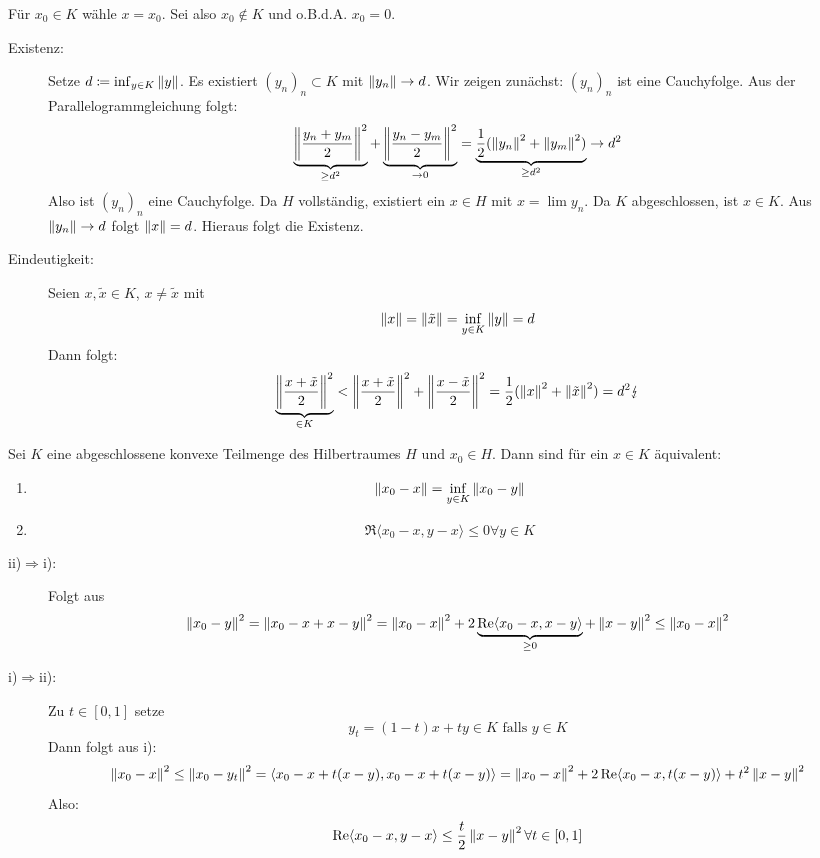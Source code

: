 \begin{beweis}
	F\"ur $ x_0\in K $ w\"ahle $ x=x_0 $. Sei also $ x_0\notin K $ und o.B.d.A. $ x_0=0 $.
	\begin{description}
		\item[Existenz:] Setze $ d\coloneqq\inf_{y\in K}\left\|y\right\| $. Es existiert $ (y_n)_n\subset K $ mit $ \left\|y_n\right\|\rightarrow d $. Wir zeigen zun\"achst: $ (y_n)_n $ ist eine Cauchyfolge. Aus der Parallelogrammgleichung folgt:
		\[ \underbrace{\left\|\frac{y_n+y_m}{2}\right\|^2}_{\geq d^2}+\underbrace{\left\|\frac{y_n-y_m}{2}\right\|^2}_{\rightarrow 0}=\underbrace{\frac{1}{2}(\left\|y_n\right\|^2+\left\|y_m\right\|^2)}_{\geq d^2}\rightarrow d^2 \]
		Also ist $ (y_n)_n $ eine Cauchyfolge. Da $ H $ vollst\"andig, existiert ein $ x\in H $ mit $ x=\lim y_n $. Da $ K $ abgeschlossen, ist $ x\in K $.
		Aus $ \left\|y_n\right\|\rightarrow d $  folgt $ \left\|x\right\|=d $. Hieraus folgt die Existenz.
		\item[Eindeutigkeit:] Seien $ x,\tilde x\in K $, $ x\neq\tilde x $ mit \[ \left\|x\right\|=\left\|\tilde x\right\|=\inf_{y\in K}\left\|y\right\|=d \]
		Dann folgt:
		\[ \underbrace{\left\|\frac{x+\tilde x}{2}\right\|^2}_{\in K}<\left\|\frac{x+\tilde x}{2}\right\|^2+\left\|\frac{x-\tilde x}{2}\right\|^2=\frac{1}{2}(\left\|x\right\|^2+\left\|\tilde x\right\|^2)=d^2\lightning \]
	\end{description}
\end{beweis}
\begin{lemma}
	Sei $ K $ eine abgeschlossene konvexe Teilmenge des Hilbertraumes $ H $ und $ x_0\in H $. Dann sind f\"ur ein $ x\in K $ \"aquivalent:
	\begin{enumerate}
		\item
		\[ \left\|x_0-x\right\|=\inf_{y\in K}\left\|x_0-y\right\| \]
		\item \[ \Re\langle x_0-x,y-x\rangle\leq 0\forall y\in K \]
	\end{enumerate}
\end{lemma}
\begin{beweis}
	\begin{description}
		\item[ii)$ \Rightarrow $i):] Folgt aus
		\[ \left\|x_0-y\right\|^2=\left\|x_0-x+x-y\right\|^2=\left\|x_0-x\right\|^2+2\underbrace{\operatorname{Re}\langle x_0-x,x-y\rangle}_{\geq 0}+\left\|x-y\right\|^2\leq\left\|x_0-x\right\|^2 \]
		\item[i)$ \Rightarrow $ii):] Zu $ t\in[0,1] $ setze
		\[ y_t=(1-t)x+ty\in K\text{ falls }y\in K \]
		Dann folgt aus i):
		\[ \left\|x_0-x\right\|^2\leq\left\|x_0-y_t\right\|^2=\langle x_0-x+t(x-y),x_0-x+t(x-y)\rangle=\left\|x_0-x\right\|^2+2\operatorname{Re}\langle x_0-x,t(x-y)\rangle+t^2\left\|x-y\right\|^2 \]
		Also:
		\[ \operatorname{Re}\langle x_0-x,y-x\rangle\leq \frac{t}{2}\left\|x-y\right\|^2\forall t\in[0,1] \]
	\end{description}
\end{beweis}
